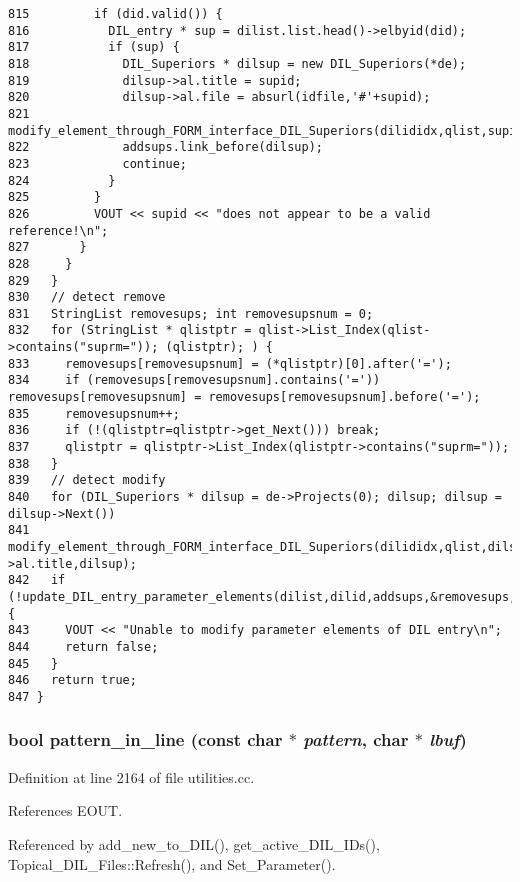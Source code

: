 \begin{verbatim}
815         if (did.valid()) {
816           DIL_entry * sup = dilist.list.head()->elbyid(did);
817           if (sup) {
818             DIL_Superiors * dilsup = new DIL_Superiors(*de);
819             dilsup->al.title = supid;
820             dilsup->al.file = absurl(idfile,'#'+supid);
821             modify_element_through_FORM_interface_DIL_Superiors(dilididx,qlist,supid,dilsup);
822             addsups.link_before(dilsup);
823             continue;
824           }
825         }
826         VOUT << supid << "does not appear to be a valid reference!\n";
827       }
828     }
829   }
830   // detect remove
831   StringList removesups; int removesupsnum = 0;
832   for (StringList * qlistptr = qlist->List_Index(qlist->contains("suprm=")); (qlistptr); ) {
833     removesups[removesupsnum] = (*qlistptr)[0].after('=');
834     if (removesups[removesupsnum].contains('=')) removesups[removesupsnum] = removesups[removesupsnum].before('=');
835     removesupsnum++;
836     if (!(qlistptr=qlistptr->get_Next())) break;
837     qlistptr = qlistptr->List_Index(qlistptr->contains("suprm="));
838   }
839   // detect modify
840   for (DIL_Superiors * dilsup = de->Projects(0); dilsup; dilsup = dilsup->Next())
841     modify_element_through_FORM_interface_DIL_Superiors(dilididx,qlist,dilsup->al.title,dilsup);
842   if (!update_DIL_entry_parameter_elements(dilist,dilid,addsups,&removesups,removesupsnum)) {
843     VOUT << "Unable to modify parameter elements of DIL entry\n";
844     return false;
845   }
846   return true;
847 }
\end{verbatim}\normalsize 
{}
\subsubsection{\setlength{\rightskip}{0pt plus 5cm}bool pattern\_\-in\_\-line (const char $\ast$ {\em pattern}, char $\ast$ {\em lbuf})}\label{dil2al_8hh_a243}




Definition at line 2164 of file utilities.cc.

References EOUT.

Referenced by add\_\-new\_\-to\_\-DIL(), get\_\-active\_\-DIL\_\-IDs(), Topical\_\-DIL\_\-Files::Refresh(), and Set\_\-Parameter().



